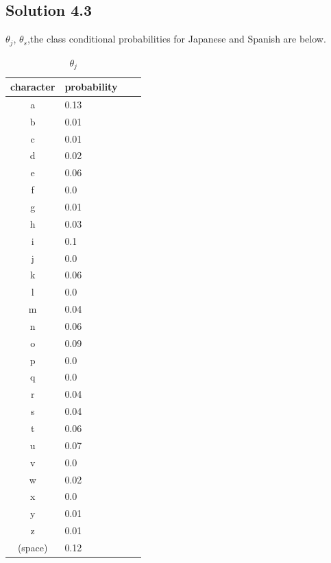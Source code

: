 \documentclass[a4paper]{article}
\theoremstyle{definition}
\newenvironment{soln}{
	\leavevmode\color{blue}\ignorespaces
}{}
\begin{document}
	\clearpage
	\subsection*{Solution 4.3}	
	\begin{soln}
	$\theta_j$, $\theta_s$,the class conditional probabilities for Japanese and Spanish are below.

\begin{table}[h]
  \begin{minipage}[t]{.45\textwidth}
    \begin{center}
        \caption{$\theta_j$}
      \begin{tabular}{clll}
   \hline
   character & probability \\
   \hline \hline

a & 0.13 \\
b & 0.01 \\
c & 0.01 \\
d & 0.02 \\
e & 0.06 \\
f & 0.0 \\
g & 0.01 \\
h & 0.03 \\
i & 0.1 \\
j & 0.0 \\
k & 0.06 \\
l & 0.0 \\
m & 0.04 \\
n & 0.06 \\
o & 0.09 \\
p & 0.0 \\
q & 0.0 \\
r & 0.04 \\
s & 0.04 \\
t & 0.06 \\
u & 0.07 \\
v & 0.0 \\
w & 0.02 \\
x & 0.0 \\
y & 0.01 \\
z & 0.01 \\
(space)  & 0.12 \\
   \hline
      \end{tabular}
    \end{center}


\end{minipage}
\end{table}
\end{soln}
\end{document}
